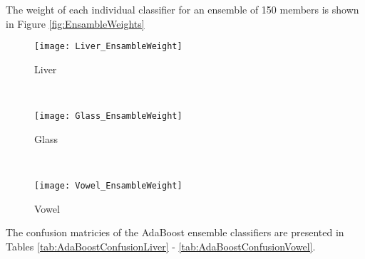The weight of each individual classifier for an ensemble of 150 members is shown in Figure \ref{fig:EnsambleWeights}
\begin{figure*}[!ht]
	\centering
	\begin{subfigure}[b]{0.3\textwidth}
		\centering
		\texttt{[image: Liver\_EnsambleWeight]}
      \caption{Liver}
	\end{subfigure}%
	~
	\begin{subfigure}[b]{0.3\textwidth}
		\centering
		\texttt{[image: Glass\_EnsambleWeight]}
        \caption{Glass}
	\end{subfigure}	
    ~
	\begin{subfigure}[b]{0.3\textwidth}
		\centering
		\texttt{[image: Vowel\_EnsambleWeight]}
        \caption{Vowel}
	\end{subfigure}%
	\caption{Distribution of Ensemble Weights}
	\label{fig:EnsambleWeights}
\end{figure*}
The confusion matricies of the AdaBoost ensemble classifiers are presented in Tables \ref{tab:AdaBoostConfusionLiver} - \ref{tab:AdaBoostConfusionVowel}.  
\begin{table}[h!]
\caption{Confusion Matrix for AdaBoost Ensemble (Liver)}
\label{tab:AdaBoostConfusionLiver}
\centering

\end{table}
\begin{table}[h!]
\caption{Confusion Matrix for AdaBoost Ensemble (Glass)}
\label{tab:AdaBoostConfusionGlass}
\centering

\end{table}
\begin{table}[h!]
\caption{Confusion Matrix for AdaBoost Ensemble (Vowel)}
\label{tab:AdaBoostConfusionVowel}
\centering

\end{table}
